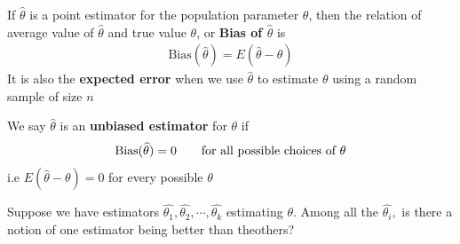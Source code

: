 \begin{defn}
If $\widehat{\theta}$ is a point estimator for the population parameter $\theta$, then the relation of average value of $\widehat{\theta}$ and true value $\theta$, or \textbf{Bias of $\widehat{\theta}$} is \begin{align*}
\text{Bias}(\widehat{\theta})=E(\widehat{\theta}-\theta)
\end{align*}
It is also the \textbf{expected error} when we use $\widehat{\theta}$ to estimate $\theta$ using a random sample of size $n$
\end{defn}
\begin{defn}
We say $\widehat{\theta}$ is an \textbf{unbiased estimator} for $\theta$ if \begin{align*}
\text{Bias}(\widehat{\theta})=0\text{\qquad for all possible choices of }\theta 
\end{align*}
i.e $E(\widehat{\theta}-\theta)=0$ for every possible $\theta$
\end{defn}
\exercise Suppose we have estimators $\widehat{\theta_1},\widehat{\theta_2},\cdots,\widehat{\theta_k}$ estimating $\theta$. Among all the $\widehat{\theta_i},$ is there a notion of one estimator being better than theothers?
